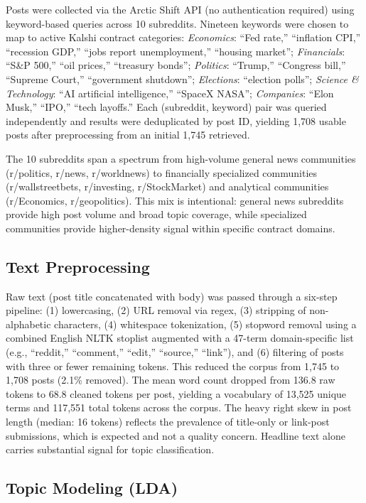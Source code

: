 \documentclass[sigconf]{acmart}
\begin{document}
Posts were collected via the Arctic Shift API (no authentication required) using keyword-based queries across 10 subreddits. Nineteen keywords were chosen to map to active Kalshi contract categories: \textit{Economics}: ``Fed rate,'' ``inflation CPI,'' ``recession GDP,'' ``jobs report unemployment,'' ``housing market''; \textit{Financials}: ``S\&P 500,'' ``oil prices,'' ``treasury bonds''; \textit{Politics}: ``Trump,'' ``Congress bill,'' ``Supreme Court,'' ``government shutdown''; \textit{Elections}: ``election polls''; \textit{Science \& Technology}: ``AI artificial intelligence,'' ``SpaceX NASA''; \textit{Companies}: ``Elon Musk,'' ``IPO,'' ``tech layoffs.'' Each (subreddit, keyword) pair was queried independently and results were deduplicated by post ID, yielding 1,708 usable posts after preprocessing from an initial 1,745 retrieved.

The 10 subreddits span a spectrum from high-volume general news communities (r/politics, r/news, r/worldnews) to financially specialized communities (r/wallstreetbets, r/investing, r/StockMarket) and analytical communities (r/Economics, r/geopolitics). This mix is intentional: general news subreddits provide high post volume and broad topic coverage, while specialized communities provide higher-density signal within specific contract domains.

\subsection{Text Preprocessing}

Raw text (post title concatenated with body) was passed through a six-step pipeline: (1) lowercasing, (2) URL removal via regex, (3) stripping of non-alphabetic characters, (4) whitespace tokenization, (5) stopword removal using a combined English NLTK stoplist augmented with a 47-term domain-specific list (e.g., ``reddit,'' ``comment,'' ``edit,'' ``source,'' ``link''), and (6) filtering of posts with three or fewer remaining tokens. This reduced the corpus from 1,745 to 1,708 posts (2.1\% removed). The mean word count dropped from 136.8 raw tokens to 68.8 cleaned tokens per post, yielding a vocabulary of 13,525 unique terms and 117,551 total tokens across the corpus. The heavy right skew in post length (median: 16 tokens) reflects the prevalence of title-only or link-post submissions, which is expected and not a quality concern. Headline text alone carries substantial signal for topic classification.

\subsection{Topic Modeling (LDA)}
\end{document}
